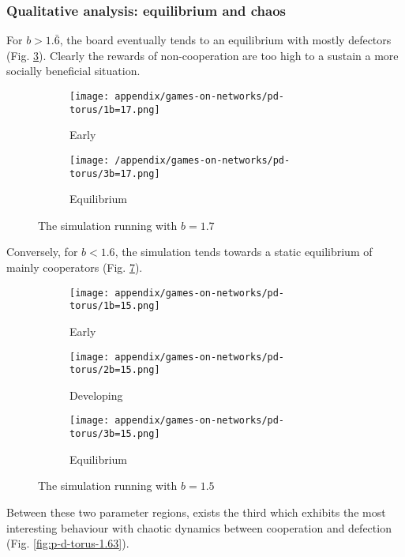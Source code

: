 \subsubsection{Qualitative analysis: equilibrium and chaos}
For $b>1.\bar{6}$, the board eventually tends to an equilibrium with mostly defectors (Fig. \ref{fig:p-d-torus-1.7}). Clearly the rewards of non-cooperation are too high to a sustain a more socially beneficial situation.
\begin{figure}
	\centering
	\begin{subfigure}{.3\textwidth}
		\centering
		\texttt{[image: appendix/games-on-networks/pd-torus/1b=17.png]}
		\caption{Early}
		\label{}
	\end{subfigure}%
	\begin{subfigure}{.3\textwidth}
		\centering
		\texttt{[image: /appendix/games-on-networks/pd-torus/3b=17.png]}
		\caption{Equilibrium}
		\label{}
	\end{subfigure}
	\caption{The simulation running with $b=1.7$}
	\label{fig:p-d-torus-1.7}
\end{figure}
Conversely, for $b<1.6$, the simulation tends towards a static equilibrium of mainly cooperators (Fig. \ref{fig:p-d-torus-1.5}).
\begin{figure}
	\centering
	\begin{subfigure}{.3\textwidth}
		\centering
		\texttt{[image: appendix/games-on-networks/pd-torus/1b=15.png]}
		\caption{Early}
		\label{fig:dir}
	\end{subfigure}%
	\begin{subfigure}{.3\textwidth}
		\centering
		\texttt{[image: appendix/games-on-networks/pd-torus/2b=15.png]}
		\caption{Developing}
		\label{fig:loop}
	\end{subfigure}
	\begin{subfigure}{.3\textwidth}
		\centering
		\texttt{[image: appendix/games-on-networks/pd-torus/3b=15.png]}
		\caption{Equilibrium}
		\label{fig:undirected}
	\end{subfigure}
	\caption{The simulation running with $b=1.5$}
	\label{fig:p-d-torus-1.5}
\end{figure}
Between these two parameter regions, exists the third which exhibits the most interesting behaviour with chaotic dynamics between cooperation and defection (Fig. \ref{fig:p-d-torus-1.63}).
